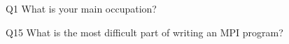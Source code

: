 \begin{description}%
\item{Q1} What is your main occupation?%
\item{Q15} What is the most difficult part of writing an MPI program?%
\end{description}%
